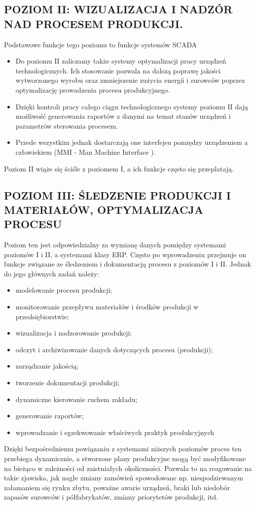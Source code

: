 \documentclass{article}
\begin{document}
    	\subsection{POZIOM II: WIZUALIZACJA I NADZÓR NAD PROCESEM PRODUKCJI.}
    	Podstawowe funkcje tego poziomu to funkcje systemów SCADA
    \begin{itemize}
    	\item Do poziomu II zaliczamy także systemy optymalizacji pracy urządzeń
    	technologicznych. Ich stosowanie pozwala na dalszą poprawę jakości
    	wytworzonego wyrobu oraz zmniejszenie zużycia energii i surowców
    	poprzez optymalizację prowadzenia procesu produkcyjnego.
    	\item Dzięki kontroli pracy całego ciągu technologicznego systemy poziomu II
    	dają możliwość generowania raportów z danymi na temat stanów urządzeń
    	i parametrów sterowania procesem.
    	\item  Przede wszystkim jednak dostarczają one interfejsu pomiędzy urządzeniem
    	a człowiekiem (MMI - Man Machine Interface ).    	
    \end{itemize}
    	Poziom II wiąże się ściśle z poziomem I, a ich funkcje często się przeplatają.
    	
    	\subsection{POZIOM III: ŚLEDZENIE PRODUKCJI I MATERIAŁÓW, OPTYMALIZACJA PROCESU}
	Poziom ten jest odpowiedzialny za wymianę danych pomiędzy systemami poziomów I i II, a
	systemami klasy ERP. Często po wprowadzeniu przejmuje on funkcje związane ze śledzeniem i
	dokumentacją procesu z poziomów I i II. Jednak do jego głównych zadań należy:
	\begin{itemize}
        \item modelowanie procesu produkcji;
        \item monitorowanie przepływu materiałów i środków produkcji w przedsiębiorstwie;
        \item wizualizacja i nadzorowanie produkcji;
        \item odczyt i archiwizowanie danych dotyczących procesu (produkcji);
        \item zarządzanie jakością;
        \item tworzenie dokumentacji produkcji;
        \item dynamiczne kierowanie ruchem zakładu;
        \item generowanie raportów;
        \item wprowadzanie i egzekwowanie właściwych praktyk produkcyjnych 
    	\end{itemize}
    Dzięki bezpośredniemu powiązaniu z systemami niższych poziomów proces ten przebiega dynamicznie, a
    stworzone plany produkcyjne mogą być modyfikowane na bieżąco w zależności od zaistniałych okoliczności.
    Pozwala to na reagowanie na takie zjawiska, jak nagłe zmiany zamówień spowodowane np. niespodziewanym
    załamaniem się rynku zbytu, poważne awarie urządzeń, braki lub niedobór zapasów surowców i półfabrykatów,
    zmiany priorytetów produkcji, itd.
\end{document}
